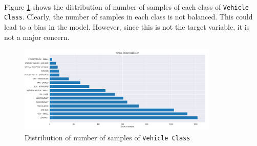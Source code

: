 \documentclass[12pt]{article}
\begin{document}
    \vspace*{0pt} \\
    Figure \ref{fig:vehicle_class} shows the distribution of number of samples of each class of \texttt{Vehicle Class}.
    Clearly, the number of samples in each class is not balanced. This could lead to a bias in the model. However,
    since this is not the target variable, it is not a major concern.
    \begin{figure}[h]
        \centering
        \includegraphics[width=0.85\textwidth]{./../Assets/vehicle_class.png}
        \caption{Distribution of number of samples of \texttt{Vehicle Class}}
        \label{fig:vehicle_class}
    \end{figure}
\end{document}
